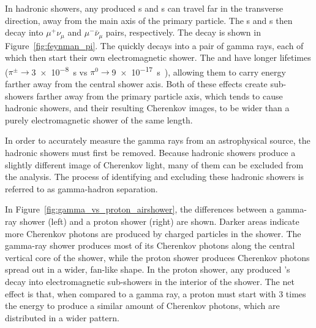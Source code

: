 
  
  In hadronic showers, any produced \pip{}s and \pim{}s can travel far in the transverse direction, away from the main axis of the primary particle.
  The \pip{}s and \pim{}s then decay into $\mu^{+}\nu_{\mu}$ and $\mu^{-}\bar{\nu}_{\mu}$ pairs, respectively.
  The \pip{} decay is shown in Figure~\ref{fig:feynman_pi}.
  The \pio{} quickly decays into a pair of gamma rays, each of which then start their own electromagnetic shower.
  The \pip{} and \pim{} have longer lifetimes ($\pi^{\pm} \rightarrow $\SI{3e-8}{s} vs $\pi^{0} \rightarrow $\SI{9e-17}{s}~\cite{pdg_2014}), allowing them to carry energy farther away from the central shower axis.
  Both of these effects create sub-showers farther away from the primary particle axis, which tends to cause hadronic showers, and their resulting Cherenkov images, to be wider than a purely electromagnetic shower of the same length. 

  In order to accurately measure the gamma rays from an astrophysical source, the hadronic showers must first be removed.
  Because hadronic showers produce a slightly different image of Cherenkov light, many of them can be excluded from the analysis.
  The process of identifying and excluding these hadronic showers is referred to as gamma-hadron separation.
  
  In Figure~\ref{fig:gamma_vs_proton_airshower}, the differences between a gamma-ray shower (left) and a proton shower (right) are shown.
  Darker areas indicate more Cherenkov photons are produced by charged particles in the shower.
  The gamma-ray shower produces most of its Cherenkov photons along the central vertical core of the shower, while the proton shower produces Cherenkov photons spread out in a wider, fan-like shape.
  In the proton shower, any produced \pio{}'s decay into electromagnetic sub-showers in the interior of the shower.
  The net effect is that, when compared to a gamma ray, a proton must start with \nicetilde{}3 times the energy to produce a similar amount of Cherenkov photons, which are distributed in a wider pattern.

